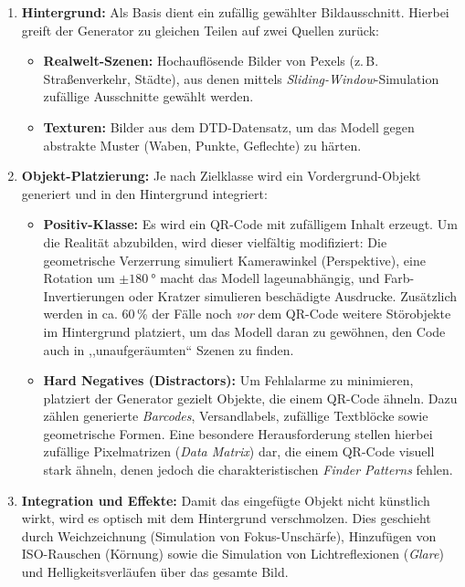 \documentclass[
    a4paper,        %
    11pt,           %
    ngerman,        %
    parskip=half,   %
    listof=totoc,   %
    bibliography=totoc %
]{scrartcl}
\begin{document}
\begin{enumerate}
    \item \textbf{Hintergrund:}
    Als Basis dient ein zufällig gewählter Bildausschnitt. Hierbei greift der Generator zu gleichen Teilen auf zwei Quellen zurück:
    \begin{itemize}
        \item \textbf{Realwelt-Szenen:} Hochauflösende Bilder von Pexels (z.\,B. Straßenverkehr, Städte), aus denen mittels \textit{Sliding-Window}-Simulation zufällige Ausschnitte gewählt werden.
        \item \textbf{Texturen:} Bilder aus dem DTD-Datensatz, um das Modell gegen abstrakte Muster (Waben, Punkte, Geflechte) zu härten.
    \end{itemize}

    \item \textbf{Objekt-Platzierung:}
    Je nach Zielklasse wird ein Vordergrund-Objekt generiert und in den Hintergrund integriert:
    \begin{itemize}
        \item \textbf{Positiv-Klasse:} Es wird ein QR-Code mit zufälligem Inhalt erzeugt. Um die Realität abzubilden, wird dieser vielfältig modifiziert: Die geometrische Verzerrung simuliert Kamerawinkel (Perspektive), eine Rotation um $\pm \SI{180}{\degree}$ macht das Modell lageunabhängig, und Farb-Invertierungen oder Kratzer simulieren beschädigte Ausdrucke.
        Zusätzlich werden in ca. 60\,\% der Fälle noch \textit{vor} dem QR-Code weitere Störobjekte im Hintergrund platziert, um das Modell daran zu gewöhnen, den Code auch in ,,unaufgeräumten`` Szenen zu finden.

        \item \textbf{Hard Negatives (Distractors):} Um Fehlalarme zu minimieren, platziert der Generator gezielt Objekte, die einem QR-Code ähneln. Dazu zählen generierte \textit{Barcodes}, Versandlabels, zufällige Textblöcke sowie geometrische Formen. Eine besondere Herausforderung stellen hierbei zufällige Pixelmatrizen (\textit{Data Matrix}) dar, die einem QR-Code visuell stark ähneln, denen jedoch die charakteristischen \textit{Finder Patterns} fehlen.

    \end{itemize}

    \item \textbf{Integration und Effekte:}
    Damit das eingefügte Objekt nicht künstlich wirkt, wird es optisch mit dem Hintergrund verschmolzen. Dies geschieht durch Weichzeichnung (Simulation von Fokus-Unschärfe), Hinzufügen von ISO-Rauschen (Körnung) sowie die Simulation von Lichtreflexionen (\textit{Glare}) und Helligkeitsverläufen über das gesamte Bild.
\end{enumerate}
\end{document}
